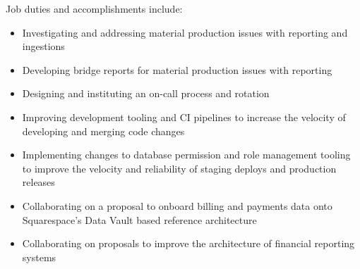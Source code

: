 \normalsize
Job duties and accomplishments include:
\small
\begin{itemize}
    \item Investigating and addressing material production issues with reporting
    and ingestions
    \item Developing bridge reports for material production issues with
    reporting
    \item Designing and instituting an on-call process and rotation
    \item Improving development tooling and CI pipelines to increase the
    velocity of developing and merging code changes
    \item Implementing changes to database permission and role management
    tooling to improve the velocity and reliability of staging deploys and
    production releases
    \item Collaborating on a proposal to onboard billing and payments data onto
    Squarespace's Data Vault based reference architecture
    \item Collaborating on proposals to improve the architecture of financial reporting systems
\end{itemize}
\normalsize
\medskip
